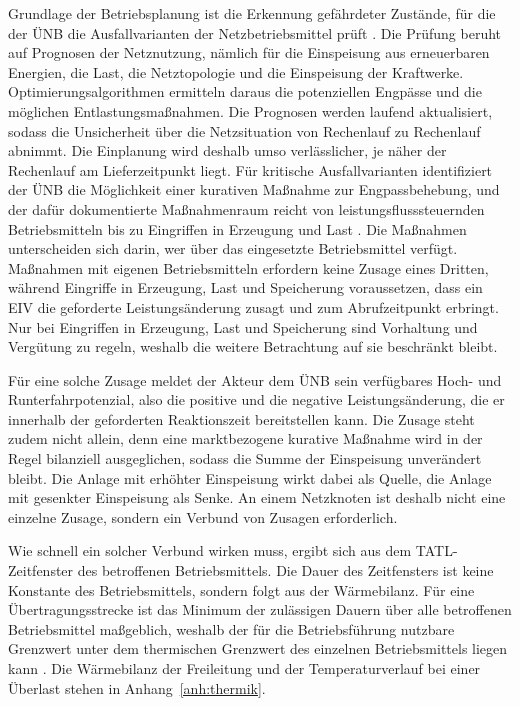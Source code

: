 Grundlage der Betriebsplanung ist die Erkennung gefährdeter Zustände, für die der \ac{ÜNB} die Ausfallvarianten der Netzbetriebsmittel prüft \cite{leeuwen_integration_2020}.
Die Prüfung beruht auf Prognosen der Netznutzung, nämlich für die Einspeisung aus erneuerbaren Energien, die Last, die Netztopologie und die Einspeisung der Kraftwerke.
Optimierungsalgorithmen ermitteln daraus die potenziellen Engpässe und die möglichen Entlastungsmaßnahmen.
Die Prognosen werden laufend aktualisiert, sodass die Unsicherheit über die Netzsituation von Rechenlauf zu Rechenlauf abnimmt.
Die Einplanung wird deshalb umso verlässlicher, je näher der Rechenlauf am Lieferzeitpunkt liegt.
Für kritische Ausfallvarianten identifiziert der \ac{ÜNB} die Möglichkeit einer kurativen Maßnahme zur Engpassbehebung, und der dafür dokumentierte Maßnahmenraum reicht von leistungsflusssteuernden Betriebsmitteln bis zu Eingriffen in Erzeugung und Last \cite{innosys_2030_gesamtverbund_innovationen_2021}.
Die Maßnahmen unterscheiden sich darin, wer über das eingesetzte Betriebsmittel verfügt.
Maßnahmen mit eigenen Betriebsmitteln erfordern keine Zusage eines Dritten, während Eingriffe in Erzeugung, Last und Speicherung voraussetzen, dass ein \ac{EIV} die geforderte Leistungsänderung zusagt und zum Abrufzeitpunkt erbringt.
Nur bei Eingriffen in Erzeugung, Last und Speicherung sind Vorhaltung und Vergütung zu regeln, weshalb die weitere Betrachtung auf sie beschränkt bleibt.

Für eine solche Zusage meldet der Akteur dem \ac{ÜNB} sein verfügbares Hoch- und Runterfahrpotenzial, also die positive und die negative Leistungsänderung, die er innerhalb der geforderten Reaktionszeit bereitstellen kann.
Die Zusage steht zudem nicht allein, denn eine marktbezogene kurative Maßnahme wird in der Regel bilanziell ausgeglichen, sodass die Summe der Einspeisung unverändert bleibt.
Die Anlage mit erhöhter Einspeisung wirkt dabei als Quelle, die Anlage mit gesenkter Einspeisung als Senke.
An einem Netzknoten ist deshalb nicht eine einzelne Zusage, sondern ein Verbund von Zusagen erforderlich.

Wie schnell ein solcher Verbund wirken muss, ergibt sich aus dem \ac{TATL}-Zeitfenster des betroffenen Betriebsmittels.
Die Dauer des Zeitfensters ist keine Konstante des Betriebsmittels, sondern folgt aus der Wärmebilanz.
Für eine Übertragungsstrecke ist das Minimum der zulässigen Dauern über alle betroffenen Betriebsmittel maßgeblich, weshalb der für die Betriebsführung nutzbare Grenzwert unter dem thermischen Grenzwert des einzelnen Betriebsmittels liegen kann \cite{dena_hoeherauslastung_2022}.
Die Wärmebilanz der Freileitung und der Temperaturverlauf bei einer Überlast stehen in Anhang~\ref{anh:thermik}.


